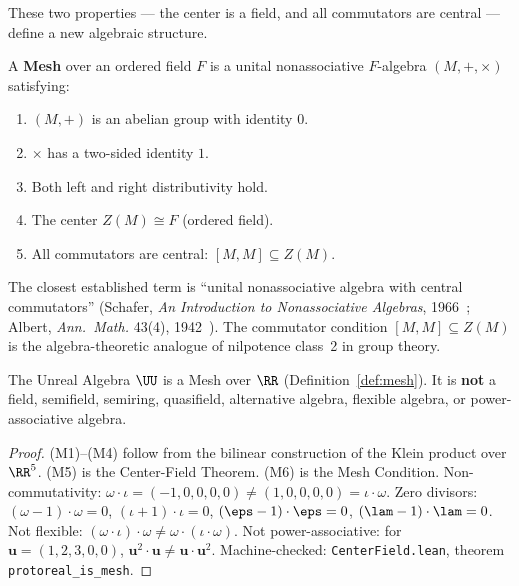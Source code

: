 These two properties --- the center is a field, and all commutators are central --- define a new algebraic structure.

\begin{definition}[Mesh]\label{def:mesh}
A \textbf{Mesh} over an ordered field $F$ is a unital nonassociative $F$-algebra $(M, +, \times)$ satisfying:
\begin{enumerate}
\item[(M1)] $(M, +)$ is an abelian group with identity $0$.
\item[(M2)] $\times$ has a two-sided identity $1$.
\item[(M3--4)] Both left and right distributivity hold.
\item[(M5)] The center $Z(M) \cong F$ (ordered field).
\item[(M6)] All commutators are central: $[M, M] \subseteq Z(M)$.
\end{enumerate}
The closest established term is ``unital nonassociative algebra with central commutators'' (Schafer, \emph{An Introduction to Nonassociative Algebras}, 1966~\cite{schafer}; Albert, \emph{Ann.\ Math.} 43(4), 1942~\cite{albert}). The commutator condition $[M, M] \subseteq Z(M)$ is the algebra-theoretic analogue of nilpotence class~2 in group theory.
\end{definition}

\begin{theorem}[$\UU$ is a Mesh]{\label{thm:mesh}}
The Unreal Algebra $\UU$ is a Mesh over $\RR$ (Definition~\ref{def:mesh}). It is \textbf{not} a field, semifield, semiring, quasifield, alternative algebra, flexible algebra, or power-associative algebra.
\end{theorem}

\begin{proof}
(M1)--(M4) follow from the bilinear construction of the Klein product over $\RR^5$. (M5) is the Center-Field Theorem. (M6) is the Mesh Condition. Non-commutativity: $\omega \cdot \iota = (-1, 0, 0, 0, 0) \neq (1, 0, 0, 0, 0) = \iota \cdot \omega$. Zero divisors: $(\omega - 1) \cdot \omega = 0$, $(\iota + 1) \cdot \iota = 0$, $(\eps - 1) \cdot \eps = 0$, $(\lam - 1) \cdot \lam = 0$. Not flexible: $(\omega \cdot \iota) \cdot \omega \neq \omega \cdot (\iota \cdot \omega)$. Not power-associative: for $\mathbf{u} = (1, 2, 3, 0, 0)$, $\mathbf{u}^2 \cdot \mathbf{u} \neq \mathbf{u} \cdot \mathbf{u}^2$. Machine-checked: \texttt{CenterField.lean}, theorem \texttt{protoreal\_is\_mesh}. \qedhere
\end{proof}

